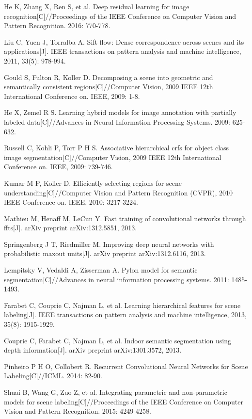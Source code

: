 \documentclass[10.5pt,compsoc]{TsT}
\theoremstyle{mystyle}
\begin{document}
{\begin{thebibliography}{99}
He K, Zhang X, Ren S, et al. Deep residual learning for image recognition[C]//Proceedings of the IEEE Conference on Computer Vision and Pattern Recognition. 2016: 770-778.

Liu C, Yuen J, Torralba A. Sift flow: Dense correspondence across scenes and its applications[J]. IEEE transactions on pattern analysis and machine intelligence, 2011, 33(5): 978-994.

Gould S, Fulton R, Koller D. Decomposing a scene into geometric and semantically consistent regions[C]//Computer Vision, 2009 IEEE 12th International Conference on. IEEE, 2009: 1-8.

He X, Zemel R S. Learning hybrid models for image annotation with partially labeled data[C]//Advances in Neural Information Processing Systems. 2009: 625-632.

Russell C, Kohli P, Torr P H S. Associative hierarchical crfs for object class image segmentation[C]//Computer Vision, 2009 IEEE 12th International Conference on. IEEE, 2009: 739-746.

Kumar M P, Koller D. Efficiently selecting regions for scene understanding[C]//Computer Vision and Pattern Recognition (CVPR), 2010 IEEE Conference on. IEEE, 2010: 3217-3224.

Mathieu M, Henaff M, LeCun Y. Fast training of convolutional networks through ffts[J]. arXiv preprint arXiv:1312.5851, 2013.

Springenberg J T, Riedmiller M. Improving deep neural networks with probabilistic maxout units[J]. arXiv preprint arXiv:1312.6116, 2013.

Lempitsky V, Vedaldi A, Zisserman A. Pylon model for semantic segmentation[C]//Advances in neural information processing systems. 2011: 1485-1493.

Farabet C, Couprie C, Najman L, et al. Learning hierarchical features for scene labeling[J]. IEEE transactions on pattern analysis and machine intelligence, 2013, 35(8): 1915-1929.

Couprie C, Farabet C, Najman L, et al. Indoor semantic segmentation using depth information[J]. arXiv preprint arXiv:1301.3572, 2013.

Pinheiro P H O, Collobert R. Recurrent Convolutional Neural Networks for Scene Labeling[C]//ICML. 2014: 82-90.

Shuai B, Wang G, Zuo Z, et al. Integrating parametric and non-parametric models for scene labeling[C]//Proceedings of the IEEE Conference on Computer Vision and Pattern Recognition. 2015: 4249-4258.


\end{thebibliography}}
\end{document}
